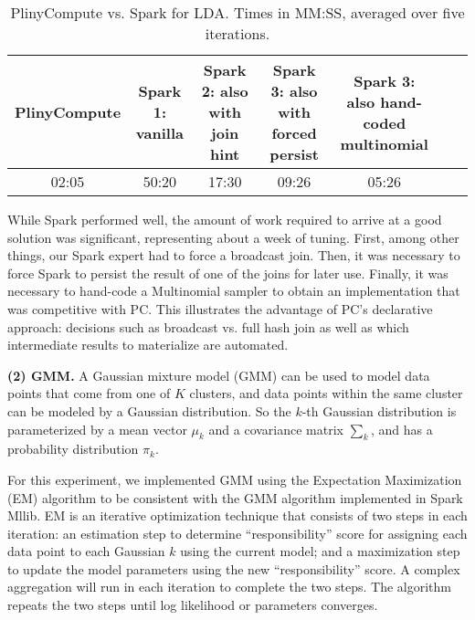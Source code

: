 \begin{table}[h!]
\begin{center}
\begin{tabular}{|c||c|c|c|c|c|c|}
\hline
PlinyCompute & \makecell{Spark 1: \\vanilla} & \makecell{Spark 2: also with \\join hint} & \makecell{Spark 3: also with \\forced persist} & \makecell{Spark 3: also hand-\\coded multinomial} \\
\hline
02:05 & 50:20 & 17:30 & 09:26 & 05:26 \\
\hline
\end{tabular}
\caption{PlinyCompute vs. Spark for LDA. Times in MM:SS, averaged over five iterations.}
\label{fig:LDA}
\end{center}
\end{table}
\vspace{-10pt}
While Spark performed well, the 
amount of work required to arrive at a good solution 
was significant, representing about a week of tuning.  First, among other things, our Spark expert had to force a 
broadcast join.  Then, it was necessary to force Spark to
persist the result of one of the joins for later use.  Finally, it was necessary to hand-code a 
Multinomial sampler to obtain an implementation that was competitive with PC.
This illustrates the advantage of PC's declarative approach: decisions such as broadcast vs. full hash
join as well as which intermediate results to materialize are
automated. 

\vspace{5pt}
\noindent
\textbf {(2) GMM.} A Gaussian mixture model (GMM) can be used to model data points that come
from one of $K$ clusters, and data points within the same cluster
can be modeled by a Gaussian distribution. So the $k$-th Gaussian
distribution is parameterized by a mean vector $\mu_k$ and a covariance
matrix $\sum_k$, and has a probability distribution $\pi_k$.

For this experiment, we
implemented GMM using the Expectation Maximization (EM) algorithm to be
consistent with the GMM algorithm implemented in Spark Mllib. EM is an
iterative optimization technique that consists of two steps in each
iteration: an estimation step to determine ``responsibility'' score
for assigning each data point to each Gaussian $k$ using the current model; and a maximization step to
update the model parameters using the new ``responsibility'' score. A complex
aggregation will run in each iteration to complete the two steps. The algorithm repeats
the two steps until log likelihood or parameters converges. 

